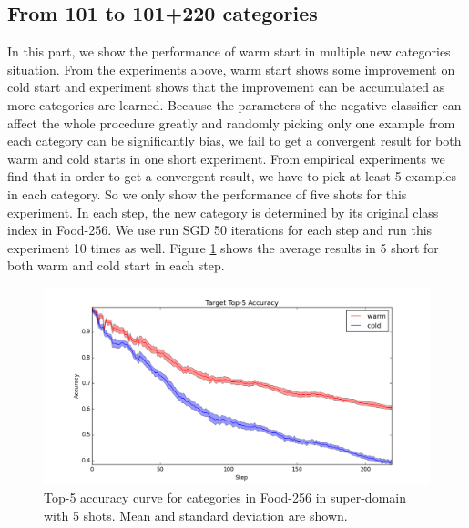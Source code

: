 \subsection{From 101 to 101+220 categories}
In this part, we show the performance of warm start in multiple new categories situation. From the experiments above, warm start shows some improvement on cold start and experiment shows that the improvement can be accumulated as more categories are learned. Because the parameters of the negative classifier can affect the whole procedure greatly and randomly picking only one example from each category can be significantly bias, we fail to get a convergent result for both warm and cold starts in one short experiment.
From empirical experiments we find that in order to get a convergent result, we have to pick at least 5 examples in each category. So we only show the performance of five shots for this experiment. In each step, the new category is determined by its original class index in Food-256. We use run SGD 50 iterations for each step and run this experiment 10 times as well. Figure \ref{fig:wama} shows the average results in 5 short for both warm and cold start in each step.

\begin{figure}
  \centering
    \includegraphics[scale=0.4]{fig/M+N.png}
    \caption{Top-5 accuracy curve for categories in Food-256 in super-domain with 5 shots. Mean and standard deviation are shown.}
      \label{fig:wama}
\end{figure}

